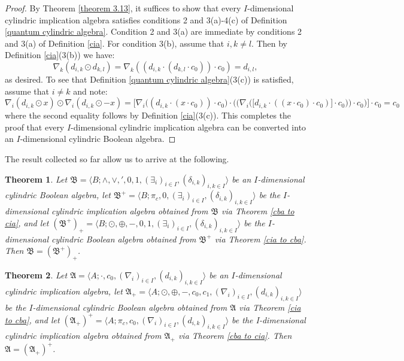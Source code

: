 \documentclass[reqno]{amsart}
\theoremstyle{plain}
\newtheorem{theorem}{Theorem}[section]
\theoremstyle{definition}
\begin{document}
\begin{proof}
    By Theorem \ref{theorem 3.13}, it suffices to show that every $I$-dimensional cylindric implication algebra satisfies conditions 2 and 3(a)-4(c) of Definition \ref{quantum cylindric algebra}. Condition 2 and 3(a) are immediate by conditions 2 and 3(a) of Definition \ref{cia}. For condition 3(b), assume that $i,k\not=l$. Then by Definition \ref{cia}(3(b)) we have: 
    \[\nabla_k(d_{i,k}\odot d_{k,l})=\nabla_{k}((d_{i,k}\cdot (d_{k,l}\cdot c_0))\cdot c_0)=d_{i,l},\] as desired. To see that Definition \ref{quantum cylindric algebra}(3(c)) is satisfied, assume that $i\not= k$ and note: 
    \[\nabla_i(d_{i,k}\odot x)\odot\nabla_{i}(d_{i,k}\odot -x)=\biggl[\nabla_i\biggl((d_{i,k}\cdot(x\cdot c_0))\cdot c_0\biggl)\cdot\biggl(\biggl(\nabla_i\biggl(\bigl[d_{i,k}\cdot((x\cdot c_0)\cdot c_0)\bigl]\cdot c_0\biggl)\biggl)\cdot c_0\biggl)\biggl]\cdot c_0=c_0\]
where the second equality follows by Definition \ref{cia}(3(c)). This completes the proof that every $I$-dimensional cylindric implication algebra can be converted into an $I$-dimensional cylindric Boolean algebra. 
\end{proof}
The result collected so far allow us to arrive at the following. 
\begin{theorem}
    Let $\mathfrak{B}=\langle B;\wedge,\vee,',0,1,(\exists_i)_{i\in I},(\delta_{i,k})_{i,k\in I}\rangle$ be an $I$-dimensional cylindric Boolean algebra, let $\mathfrak{B}^+=\langle B;\pi_c,0,(\exists_i)_{i\in I},(\delta_{i,k})_{i,k\in I}\rangle$ be the $I$-dimensional cylindric implication algebra obtained from $\mathfrak{B}$ via Theorem \ref{cba to cia}, and let $(\mathfrak{B}^{+})_+=\langle B;\odot,\oplus,-,0,1,(\exists_i)_{i\in I},(\delta_{i,k})_{i,k\in I}\rangle$ be the $I$-dimensional cylindric Boolean algebra obtained from $\mathfrak{B}^+$ via Theorem \ref{cia to cba}. Then $\mathfrak{B}=(\mathfrak{B}^+)_+$. 
\end{theorem}
\begin{theorem}
    Let $\mathfrak{A}=\langle A;\cdot,c_0,(\nabla_i)_{i\in I}, (d_{i,k})_{i,k\in I}\rangle$ be an $I$-dimensional cylindric implication algebra, let $\mathfrak{A}_+=\langle A;\odot,\oplus,-,c_0,c_1,(\nabla_i)_{i\in I},(d_{i,k})_{i,k\in I}\rangle$ be the $I$-dimensional cylindric Boolean algebra obtained from $\mathfrak{A}$ via Theorem \ref{cia to cba}, and let $(\mathfrak{A}_+)^+=\langle A;\pi_c,c_0,(\nabla_{i})_{i\in I},(d_{i,k})_{i,k\in I}\rangle$ be the I-dimensional cylindric implication algebra obtained from $\mathfrak{A}_+$ via Theorem \ref{cba to cia}. Then $\mathfrak{A}=(\mathfrak{A}_+)^+$. 
\end{theorem}
\end{document}
